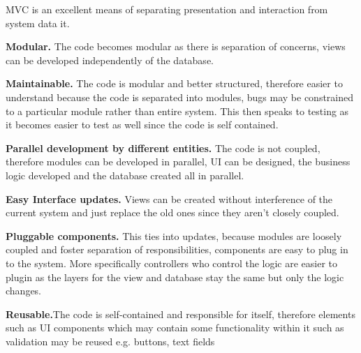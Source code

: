MVC is an excellent means of separating presentation and interaction from system data it. \par

\textbf{Modular.} The code becomes modular as there is separation of concerns, views can be developed independently of the database.\par

\textbf{Maintainable.} The code is modular and better structured, therefore easier to understand because the code is separated into modules,
bugs may be constrained to a particular module rather than entire system. This then speaks to testing as
it becomes easier to test as well since the code is self contained. \par

\textbf{Parallel development by different entities.} The code is not coupled, therefore modules can be developed in parallel, UI can
be designed, the business logic developed and the database created all in parallel. \par

\textbf{Easy Interface updates.} Views can be created without interference of the current system and just replace the
old ones since they aren't closely coupled. \par

\textbf{Pluggable components.} This ties into updates, because modules are loosely coupled and foster separation of responsibilities, components are easy to plug in to the system. More specifically controllers who control the logic are easier to plugin as
the layers for the view and database stay the same but only the logic changes.\par

\textbf{Reusable.}The code is self-contained and responsible for itself, therefore elements such as UI components
which may contain some functionality within it such as validation may be reused e.g. buttons, text fields
